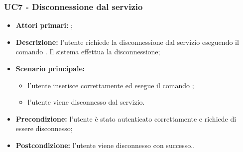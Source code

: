 \subsubsection{UC7 - Disconnessione dal servizio}
\begin{itemize}
	\item \textbf{Attori primari:} \ua{};
	\item \textbf{Descrizione:} l’utente richiede la disconnessione dal servizio eseguendo il comando \logout{}. Il sistema effettua la disconnessione; 
	\item \textbf{Scenario principale:} 
	\begin{itemize}
		\item l'utente inserisce correttamente ed esegue il comando \logout{}; 
		\item l'utente viene disconnesso dal servizio. 
	\end{itemize}
	\item \textbf{Precondizione:} l’utente è stato autenticato correttamente e richiede di essere disconnesso; 
	\item \textbf{Postcondizione:} l’utente viene disconnesso con successo..
\end{itemize}